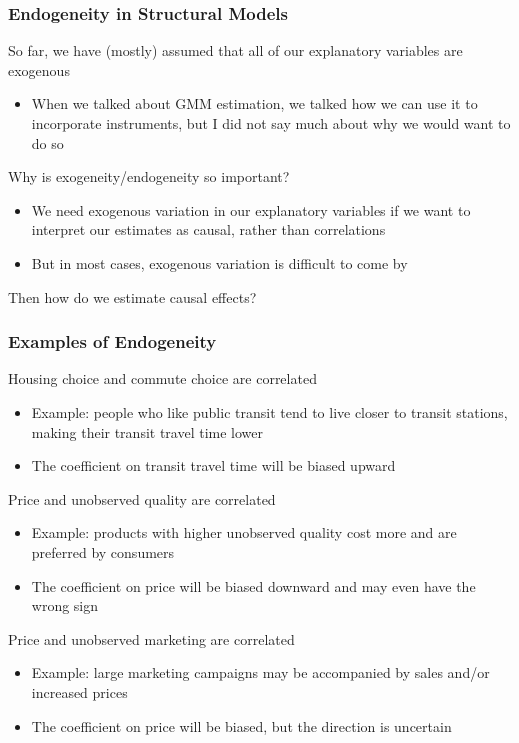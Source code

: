 \documentclass{beamer}
\begin{document}
\begin{frame}\frametitle{Endogeneity in Structural Models}
    So far, we have (mostly) assumed that all of our explanatory variables are exogenous
    \begin{itemize}
        \item When we talked about GMM estimation, we talked how we can use it to incorporate instruments, but I did not say much about why we would want to do so
    \end{itemize}
    \vspace{2ex}
    Why is exogeneity/endogeneity so important?
    \begin{itemize}
        \item We need exogenous variation in our explanatory variables if we want to interpret our estimates as causal, rather than correlations
        \item But in most cases, exogenous variation is difficult to come by
    \end{itemize}
    \vspace{2ex}
    Then how do we estimate causal effects?
\end{frame}

\begin{frame}\frametitle{Examples of Endogeneity}
    Housing choice and commute choice are correlated
    \begin{itemize}
        \item Example: people who like public transit tend to live closer to transit stations, making their transit travel time lower
        \item The coefficient on transit travel time will be biased upward
    \end{itemize}
    \vspace{2ex}
    Price and unobserved quality are correlated
    \begin{itemize}
        \item Example: products with higher unobserved quality cost more and are preferred by consumers
        \item The coefficient on price will be biased downward and may even have the wrong sign
    \end{itemize}
    \vspace{2ex}
    Price and unobserved marketing are correlated
    \begin{itemize}
        \item Example: large marketing campaigns may be accompanied by sales and/or increased prices
        \item The coefficient on price will be biased, but the direction is uncertain
    \end{itemize}
\end{frame}
\end{document}
